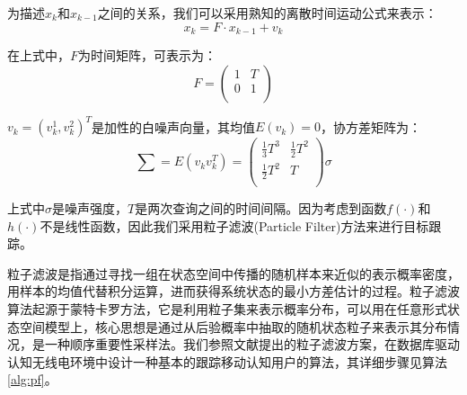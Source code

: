 为描述$x_{k}$和$x_{k-1}$之间的关系，我们可以采用熟知的离散时间运动公式\cite{bar2004estimation}来表示：
\begin{equation}
x_{k}=F \cdot x_{k-1} + v_{k}
\end{equation}

在上式中，$F$为时间矩阵，可表示为：
\begin{equation}       %
F=
\left(                 %
  \begin{array}{cc}   %
    1 & T\\  %
    0 & 1\\  %
  \end{array}
\right)                 %
\end{equation}

$v_{k}=(v_{k}^{1},v_{k}^{2})^{T}$是加性的白噪声向量，其均值$E(v_{k})=0$，协方差矩阵为：
\begin{equation}
\sum = E(v_{k}v_{k}^{T})=
\left(                 %
  \begin{array}{cc}   %
    \frac{1}{3}T^{3} & \frac{1}{2}T^{2}\\  %
    \frac{1}{2}T^{2} & T\\  %
  \end{array}
\right)                 %
\sigma
\end{equation}

上式中$\sigma$是噪声强度，$T$是两次查询之间的时间间隔。因为考虑到函数$f(\cdot)$和$h(\cdot)$不是线性函数，因此我们采用粒子滤波(Particle Filter)\cite{arulampalam2002tutorial}方法来进行目标跟踪。

粒子滤波是指通过寻找一组在状态空间中传播的随机样本来近似的表示概率密度，用样本的均值代替积分运算，进而获得系统状态的最小方差估计的过程。粒子滤波算法起源于蒙特卡罗方法\cite{hastings1970monte}，它是利用粒子集来表示概率分布，可以用在任意形式状态空间模型上，核心思想是通过从后验概率中抽取的随机状态粒子来表示其分布情况，是一种顺序重要性采样法。我们参照文献\cite{bahrak2013ex}提出的粒子滤波方案，在数据库驱动认知无线电环境中设计一种基本的跟踪移动认知用户的算法，其详细步骤见算法\ref{alg:pf}。

